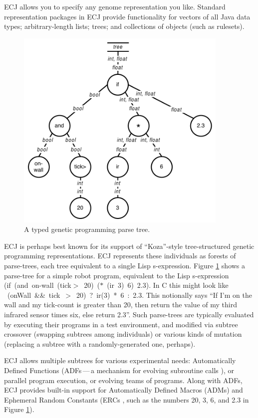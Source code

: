 \documentclass[twoside,10pt]{book}
\newcommand\lisp[1]{\textsf{#1}}
\begin{document}
ECJ allows you to specify any genome representation you like.  Standard representation packages in ECJ provide functionality for vectors of all Java data types; arbitrary-length lists; trees; and collections of objects (such as rulesets).



\begin{figure}[t]
\begin{center}
\includegraphics[width=4in]{parsetree.pdf}
\end{center}
\caption{A typed genetic programming parse tree.}
\label{parsetree}
\end{figure}


ECJ is perhaps best known for its support of ``Koza''-style tree-structured genetic programming representations.  ECJ represents these individuals as forests of parse-trees, each tree equivalent to a single Lisp s-expression.  Figure \ref{parsetree} shows a parse-tree for a simple robot program, equivalent to the Lisp s-expression \mbox{\lisp{(if (and on-wall (tick\(>\) 20) (\(\ast\) (ir 3) 6) 2.3).}}  In C this might look like \mbox{\lisp{ (onWall \&\& tick \(>\) 20) ? ir(3) * 6 : 2.3}.}  This notionally says ``If I'm on the wall and my tick-count is greater than 20, then return the value of my third infrared sensor times six, else return 2.3''.  Such parse-trees are typically evaluated by executing their programs in a test environment, and modified via subtree crossover (swapping subtrees among individuals) or various kinds of mutation (replacing a subtree with a randomly-generated one, perhaps).  

ECJ allows multiple subtrees for various experimental needs: Automatically Defined Functions (ADFs\,---\,a mechanism for evolving subroutine calls \cite{koza:gp2}), or parallel program execution, or evolving teams of programs.  Along with ADFs, ECJ provides built-in support for Automatically Defined Macros (ADMs) \cite{adm} and Ephemeral Random Constants (ERCs \cite{koza:book}, such as the numbers 20, 3, 6, and 2.3 in Figure \ref{parsetree}).
\end{document}
